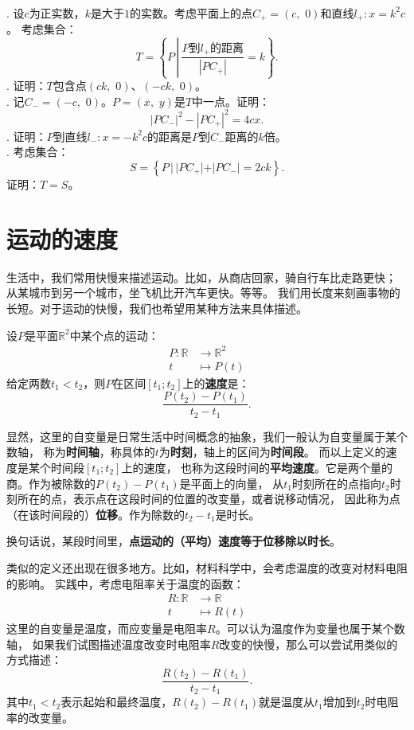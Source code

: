 \documentclass[12pt,UTF8]{ctexbook}
\begin{document}
\begin{xt}
    \mbox{} \\
    . 设$c$为正实数，$k$是大于$1$的实数。考虑平面上的点$C_+ = (c,\,\, 0)$和直线$l_+ : x = k^2c$。
    考虑集合：
    $$T = \left\{P\,\left| \, \frac{P\mbox{到}l_+\mbox{的距离}}{|PC_+|} = k\right.\right\}.$$
    . 证明：$T$包含点$(ck, \,\,0)$、$(-ck,\,\,0)$。\\
    . 记$C_- = (-c,\,\,0)$。$P = (x,\,\, y)$是$T$中一点。证明：
    $$ |PC_-|^2 - |PC_+|^2 = 4cx.$$
    . 证明：$P$到直线$l_-: x = -k^2c$的距离是$P$到$C_-$距离的$k$倍。\\
    . 考虑集合：
    $$ S = \left\{P\,| \, |PC_+| + |PC_-| = 2ck\right\}.$$
    证明：$T = S$。
\end{xt}

\section{运动的速度}
生活中，我们常用快慢来描述运动。比如，从商店回家，骑自行车比走路更快；
从某城市到另一个城市，坐飞机比开汽车更快。等等。
我们用长度来刻画事物的长短。对于运动的快慢，我们也希望用某种方法来具体描述。

\begin{df}
    设$P$是平面$\mathbb{R}^2$中某个点的运动：
    \begin{align*}
        P: \mathbb{R} &\rightarrow \mathbb{R}^2  \\
             t \, &\mapsto P(t) 
    \end{align*}
    给定两数$t_1 < t_2$，则$P$在区间$[t_1;t_2]$上的\textbf{速度}是：
    $$ \frac{P(t_2) - P(t_1)}{t_2 - t_1}.$$
\end{df}
显然，这里的自变量是日常生活中时间概念的抽象，我们一般认为自变量属于某个数轴，
称为\textbf{时间轴}，称具体的$t$为\textbf{时刻}，轴上的区间为\textbf{时间段}。
而以上定义的速度是某个时间段$[t_1;t_2]$上的速度，
也称为这段时间的\textbf{平均速度}。它是两个量的商。作为被除数的$P(t_2) - P(t_1)$是平面上的向量，
从$t_1$时刻所在的点指向$t_2$时刻所在的点，表示点在这段时间的位置的改变量，或者说移动情况，
因此称为点（在该时间段的）\textbf{位移}。作为除数的$t_2 - t_1$是时长。

换句话说，某段时间里，\textbf{点运动的（平均）速度等于位移除以时长}。

类似的定义还出现在很多地方。比如，材料科学中，会考虑温度的改变对材料电阻的影响。
实践中，考虑电阻率关于温度的函数：
\begin{align*}
    R: \mathbb{R} &\rightarrow \mathbb{R}  \\
         t \, &\mapsto R(t) 
\end{align*}
这里的自变量是温度，而应变量是电阻率$R$。可以认为温度作为变量也属于某个数轴，
如果我们试图描述温度改变时电阻率$R$改变的快慢，那么可以尝试用类似的方式描述：
$$ \frac{R(t_2) - R(t_1)}{t_2 - t_1}.$$
其中$t_1 < t_2$表示起始和最终温度，$R(t_2) - R(t_1)$就是温度从$t_1$增加到$t_2$时电阻率的改变量。
\end{document}
